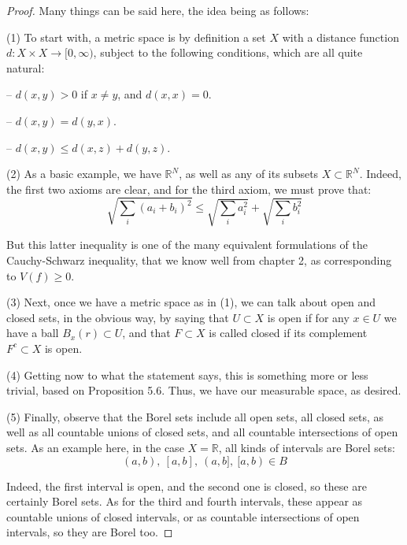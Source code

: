 \documentclass[12pt]{amsbook}
\begin{document}
\begin{proof}
Many things can be said here, the idea being as follows:

\medskip

(1) To start with, a metric space is by definition a set $X$ with a distance function $d:X\times X\to[0,\infty)$, subject to the following conditions, which are all quite natural:

\medskip

--  $d(x,y)>0$ if $x\neq y$, and $d(x,x)=0$.

\smallskip

-- $d(x,y)=d(y,x)$.

\smallskip

-- $d(x,y)\leq d(x,z)+d(y,z)$.

\medskip

(2) As a basic example, we have $\mathbb R^N$, as well as any of its subsets $X\subset\mathbb R^N$. Indeed, the first two axioms are clear, and for the third axiom, we must prove that:
$$\sqrt{\sum_i(a_i+b_i)^2}\leq\sqrt{\sum_i a_i^2}+\sqrt{\sum_i b_i^2}$$

But this latter inequality is one of the many equivalent formulations of the Cauchy-Schwarz inequality, that we know well from chapter 2, as corresponding to $V(f)\geq 0$.

\medskip

(3) Next, once we have a metric space as in (1), we can talk about open and closed sets, in the obvious way, by saying that $U\subset X$ is open if for any $x\in U$ we have a ball $B_x(r)\subset U$, and that $F\subset X$ is called closed if its complement $F^c\subset X$ is open.

\medskip

(4) Getting now to what the statement says, this is something more or less trivial, based on Proposition 5.6. Thus, we have our measurable space, as desired.

\medskip

(5) Finally, observe that the Borel sets include all open sets, all closed sets, as well as all countable unions of closed sets, and all countable intersections of open sets. As an example here, in the case $X=\mathbb R$, all kinds of intervals are Borel sets:
$$(a,b),\ [a,b],\ (a,b],\ [a,b)\in B$$

Indeed, the first interval is open, and the second one is closed, so these are certainly Borel sets. As for the third and fourth intervals, these appear as countable unions of closed intervals, or as countable intersections of open intervals, so they are Borel too.
\end{proof}
\end{document}

